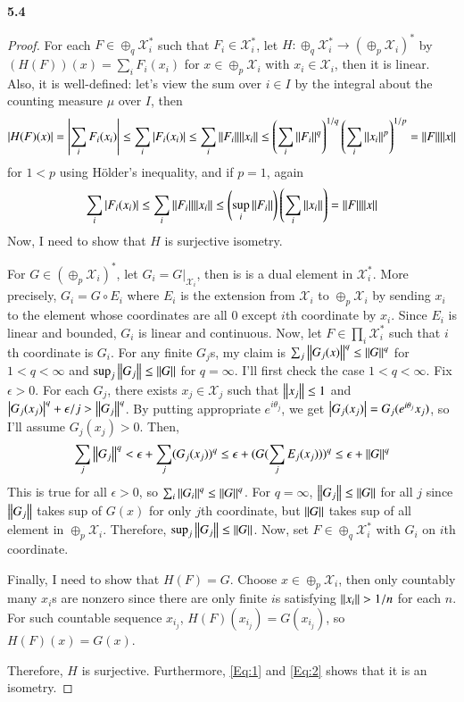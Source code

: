 \documentclass[a4paper, 12pt]{article}
\theoremstyle{Mydefinition}
\theoremstyle{Mytheorem}
\begin{document}
\noindent \textbf{5.4}
\begin{proof}
For each $F\in \oplus_q \mathscr{X}_i^*$ such that $F_i\in \mathscr{X}_i^*$, let $H:\oplus_q \mathscr{X}_i^*\rightarrow (\oplus_p \mathscr{X}_i)^*$ by $(H(F))(x) = \sum_i F_i(x_i)$ for $x\in \oplus_p \mathscr{X}_i$ with $x_i\in \mathscr{X}_i$, then it is linear. Also, it is well-defined: let's view the sum over $i\in I$ by the integral about the counting measure $\mu$ over $I$, then
\begin{equation}\label{Eq:1}
\abs{H(F)(x)} = \abs{\sum_i F_i(x_i)}\leq \sum_i \abs{F_i(x_i)}\leq \sum_i \norm{F_i}\norm{x_i}\leq \left(\sum_i \norm{F_i}^q\right)^{1/q}\left(\sum_i \norm{x_i}^p\right)^{1/p} = \norm{F}\norm{x}
\end{equation}
for $1<p$ using H\"older's inequality, and if $p=1$, again
\begin{equation}
\sum_i \abs{F_i(x_i)}\leq \sum_i \norm{F_i}\norm{x_i}\leq \left(\sup_i \norm{F_i}\right)\left(\sum_i \norm{x_i}\right) = \norm{F}\norm{x}
\end{equation}
Now, I need to show that $H$ is surjective isometry.

For $G\in (\oplus_p \mathscr{X}_i)^*$, let $G_i = G|_{\mathscr{X}_i}$, then is is a dual element in $\mathscr{X}_i^*$. More precisely, $G_i = G \circ E_i$ where $E_i$ is the extension from $\mathscr{X}_i$ to $\oplus_p \mathscr{X}_i$ by sending $x_i$ to the element whose coordinates are all $0$ except $i$th coordinate by $x_i$. Since $E_i$ is linear and bounded, $G_i$ is linear and continuous. Now, let $F\in\prod_i \mathscr{X}_i^*$ such that $i$th coordinate is $G_i$. For any finite $G_j$s, my claim is $\sum_j \norm{G_j(x)}^q\leq \norm{G}^q$ for $1<q<\infty$ and $\sup_j\norm{G_j}\leq \norm{G}$ for $q=\infty$. I'll first check the case $1<q<\infty$. Fix $\epsilon>0$. For each $G_j$, there exists $x_j\in \mathscr{X}_j$ such that $\norm{x_j}\leq 1$ and $\abs{G_j(x_j)}^q+\epsilon/j > \norm{G_j}^q$. By putting appropriate $e^{i\theta_j}$, we get $\abs{G_j(x_j)} = G_j(e^{i\theta_j}x_j)$, so I'll assume $G_j(x_j)>0$. Then,
\begin{equation}\label{Eq:2}
    \sum_j \norm{G_j}^q < \epsilon + \sum_j (G_j(x_j))^q \leq \epsilon + (G(\sum_j E_j(x_j)))^q\leq \epsilon + \norm{G}^q
\end{equation}
This is true for all $\epsilon>0$, so $\sum_i \norm{G_i}^q\leq \norm{G}^q$. For $q=\infty$, $\norm{G_j} \leq \norm{G}$ for all $j$ since $\norm{G_j}$ takes sup of $G(x)$ for only $j$th coordinate, but $\norm{G}$ takes sup of all element in $\oplus_p \mathscr{X}_i$. Therefore, $\sup_j \norm{G_j}\leq \norm{G}$. Now, set $F\in\oplus_q \mathscr{X}_i^*$ with $G_i$ on $i$th coordinate.

Finally, I need to show that $H(F) = G$. Choose $x\in \oplus_p \mathscr{X}_i$, then only countably many $x_i$s are nonzero since there are only finite $i$s satisfying $\norm{x_i}>1/n$ for each $n$. For such countable sequence $x_{i_j}$, $H(F)(x_{i_j}) = G(x_{i_j})$, so $H(F)(x) = G(x)$.

Therefore, $H$ is surjective. Furthermore, \eqref{Eq:1} and \eqref{Eq:2} shows that it is an isometry.
\end{proof}
\end{document}
